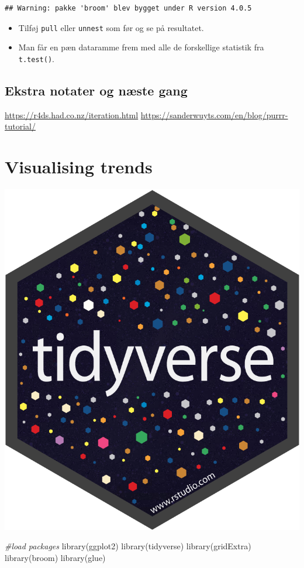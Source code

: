 \documentclass[
]{book}
\newenvironment{Shaded}{\begin{snugshade}}{\end{snugshade}}
\newcommand{\CommentTok}[1]{\textcolor[rgb]{0.56,0.35,0.01}{\textit{#1}}}
\newcommand{\ErrorTok}[1]{\textcolor[rgb]{0.64,0.00,0.00}{\textbf{#1}}}
\newcommand{\FunctionTok}[1]{\textcolor[rgb]{0.00,0.00,0.00}{#1}}
\newcommand{\NormalTok}[1]{#1}
\newcommand{\OtherTok}[1]{\textcolor[rgb]{0.56,0.35,0.01}{#1}}
\newcommand{\SpecialCharTok}[1]{\textcolor[rgb]{0.00,0.00,0.00}{#1}}
\providecommand{\tightlist}{%
  \setlength{\itemsep}{0pt}\setlength{\parskip}{0pt}}
\begin{document}
\begin{verbatim}
## Warning: pakke 'broom' blev bygget under R version 4.0.5
\end{verbatim}

\begin{Shaded}
\end{Shaded}

\begin{itemize}
\tightlist
\item
  Tilføj \texttt{pull} eller \texttt{unnest} som før og se på resultatet.
\item
  Man får en pæn dataramme frem med alle de forskellige statistik fra \texttt{t.test()}.
\end{itemize}

\hypertarget{ekstra-notater-og-nuxe6ste-gang}{%
\section{Ekstra notater og næste gang}\label{ekstra-notater-og-nuxe6ste-gang}}

\url{https://r4ds.had.co.nz/iteration.html}
\url{https://sanderwuyts.com/en/blog/purrr-tutorial/}

\hypertarget{visualising-trends}{%
\chapter{Visualising trends}\label{visualising-trends}}

\includegraphics[width=0.15\linewidth]{plots/hex-tidyverse}

\begin{Shaded}
\begin{Highlighting}[]
\CommentTok{\#load packages}
\FunctionTok{library}\NormalTok{(ggplot2)}
\FunctionTok{library}\NormalTok{(tidyverse)}
\FunctionTok{library}\NormalTok{(gridExtra)}
\FunctionTok{library}\NormalTok{(broom)}
\FunctionTok{library}\NormalTok{(glue)}
\end{Highlighting}
\end{Shaded}
\end{document}

